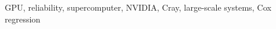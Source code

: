 \documentclass[conference]{IEEEtran}
\begin{document}
\maketitle

\begin{abstract}

\end{abstract}

\begin{IEEEkeywords}
GPU, reliability, supercomputer, NVIDIA, Cray, large-scale systems, Cox regression
\end{IEEEkeywords}

%

%
%

%






%

\end{document}
